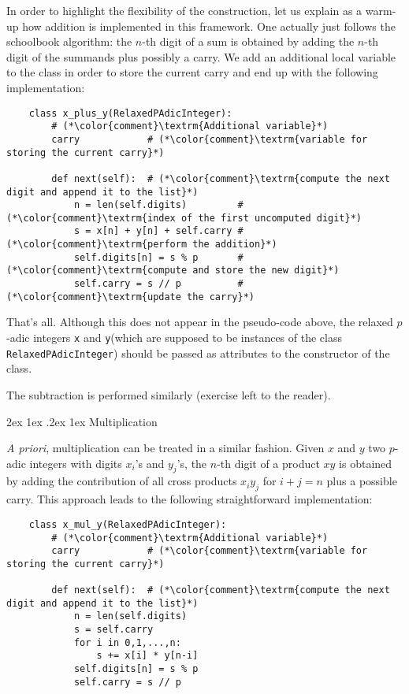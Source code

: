 \documentclass[11pt]{article}
\makeatletter
\numberwithin{equation}{section}
\numberwithin{figure}{section}
\renewcommand\paragraph{\@startsection{paragraph}{4}{\z@}%
                                    {2ex \@plus1ex \@minus.2ex}%
                                    {1ex}%
                                    {\normalfont\normalsize\bfseries}}
\theoremstyle{definition}
\newcommand{\ttx}{\texttt{\rm x}\xspace}
\newcommand{\tty}{\texttt{\rm y}\xspace}
\makeatother
\begin{document}
In order to highlight the flexibility of the construction, let us 
explain as a warm-up how addition is implemented in this framework.
One actually just follows the schoolbook algorithm: the $n$-th digit
of a sum is obtained by adding the $n$-th digit of the summands plus
possibly a carry. We add an additional local variable to the class in
order to store the current carry and end up with the following
implementation:

\begin{lstlisting}
    class x_plus_y(RelaxedPAdicInteger):
        # (*\color{comment}\textrm{Additional variable}*)
        carry            # (*\color{comment}\textrm{variable for storing the current carry}*)

        def next(self):  # (*\color{comment}\textrm{compute the next digit and append it to the list}*)
            n = len(self.digits)         # (*\color{comment}\textrm{index of the first uncomputed digit}*)
            s = x[n] + y[n] + self.carry # (*\color{comment}\textrm{perform the addition}*)
            self.digits[n] = s % p       # (*\color{comment}\textrm{compute and store the new digit}*)
            self.carry = s // p          # (*\color{comment}\textrm{update the carry}*)
\end{lstlisting}

\noindent
That's all. Although this does not appear in the pseudo-code above, the 
relaxed $p$-adic integers \ttx and \tty (which are supposed to be 
instances of the class \texttt{RelaxedPAdicInteger}) should be passed as 
attributes to the constructor of the class.

The subtraction is performed similarly (exercise left to the reader).

\paragraph{Multiplication}

\emph{A priori}, multiplication can be treated in a similar fashion. 
Given $x$ and $y$ two $p$-adic integers with digits $x_i$'s and $y_j$'s, 
the $n$-th digit of a product $xy$ is obtained by adding the 
contribution of all cross products $x_i y_j$ for $i+j=n$ plus a possible 
carry. This approach leads to the following straightforward 
implementation:

\begin{lstlisting}
    class x_mul_y(RelaxedPAdicInteger):
        # (*\color{comment}\textrm{Additional variable}*)
        carry            # (*\color{comment}\textrm{variable for storing the current carry}*)

        def next(self):  # (*\color{comment}\textrm{compute the next digit and append it to the list}*)
            n = len(self.digits)
            s = self.carry
            for i in 0,1,...,n:
                s += x[i] * y[n-i]
            self.digits[n] = s % p
            self.carry = s // p
\end{lstlisting}
\end{document}
